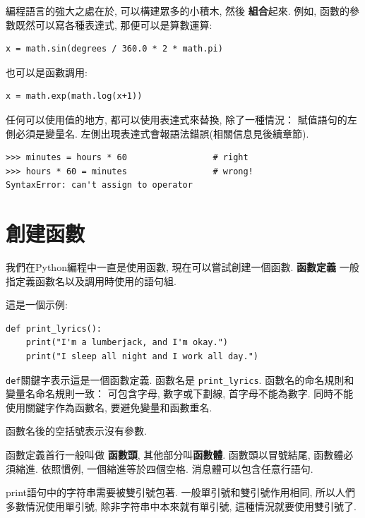 \documentclass[10pt]{book}
\begin{document}
編程語言的強大之處在於, 可以構建眾多的小積木, 然後 {\bf 組合}起來. 
例如, 函數的參數既然可以寫各種表達式, 那便可以是算數運算:

\begin{verbatim}
x = math.sin(degrees / 360.0 * 2 * math.pi)
\end{verbatim}
%
也可以是函數調用:

\begin{verbatim}
x = math.exp(math.log(x+1))
\end{verbatim}
%
任何可以使用值的地方, 都可以使用表達式來替換, 除了一種情況：
賦值語句的左側必須是變量名. 
左側出現表達式會報語法錯誤(相關信息見後續章節). 

\begin{verbatim}
>>> minutes = hours * 60                 # right
>>> hours * 60 = minutes                 # wrong!
SyntaxError: can't assign to operator
\end{verbatim}
%


\section{創建函數}

我們在Python編程中一直是使用函數, 現在可以嘗試創建一個函數. 
{\bf 函數定義} 一般指定義函數名以及調用時使用的語句組. 

這是一個示例:

\begin{verbatim}
def print_lyrics():
    print("I'm a lumberjack, and I'm okay.")
    print("I sleep all night and I work all day.")
\end{verbatim}
%

{\tt def}關鍵字表示這是一個函數定義. 
函數名是 \verb"print_lyrics". 
函數名的命名規則和變量名命名規則一致：
可包含字母, 數字或下劃線, 首字母不能為數字. 
同時不能使用關鍵字作為函數名, 要避免變量和函數重名. 

函數名後的空括號表示沒有參數. 

函數定義首行一般叫做 {\bf 函數頭}, 其他部分叫{\bf 函數體}.
函數頭以冒號結尾, 函數體必須縮進. 
依照慣例, 一個縮進等於四個空格. 
消息體可以包含任意行語句. 

print語句中的字符串需要被雙引號包著. 
一般單引號和雙引號作用相同, 所以人們多數情況使用單引號, 
除非字符串中本來就有單引號, 這種情況就要使用雙引號了. 
\end{document}
